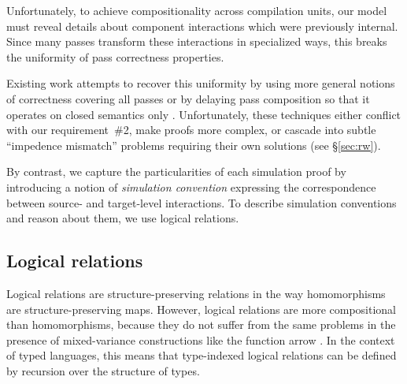 \documentclass[sigplan,10pt,review]{acmart}
\begin{document}
Unfortunately,
to achieve compositionality across compilation units,
our model must reveal details
about component interactions
which were previously internal.
Since many passes transform
these interactions in
specialized ways,
this breaks the uniformity
of pass correctness properties.

Existing work attempts to recover this uniformity
by using more general notions of correctness
covering all passes
\cite{compcompcert,compcertm}
or by delaying pass composition so that
it operates on closed semantics only
\cite{sepcompcert,compcertm}.
Unfortunately, these techniques either
conflict with our requirement~\#2,
make proofs more complex,
or cascade into subtle ``impedence mismatch'' problems
requiring their own solutions
(see \S\ref{sec:rw}).

By contrast,
we capture the particularities of each simulation proof
by introducing a notion of \emph{simulation convention}
expressing the correspondence between
source- and target-level interactions.
To describe simulation conventions
and reason about them,
we use logical relations.



\subsection{Logical relations} \label{sec:logrel} %

Logical relations are structure-preserving relations
in the way homomorphisms are structure-preserving maps.
However,
logical relations are more compositional than homomorphisms,
because they do not suffer from the same problems
in the presence of mixed-variance constructions
like the function arrow %
\cite{lrp}.
In the context of typed languages,
this means that type-indexed logical relations
can be defined by recursion over the structure of types.

\end{document}
